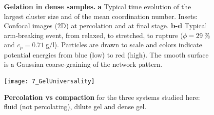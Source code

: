 \begin{figure}
	\centering
	\caption{\textbf{Gelation in dense samples.} \textbf{a} Typical time evolution of the largest cluster size and of the mean coordination number. Insets: Confocal images (2D) at percolation and at final stage. \textbf{b-d} Typical arm-breaking event, from relaxed, to stretched, to rupture ($\phi=29~\%$ and $c_p=\SI{0.71}{\gram\per\litre}$). Particles are drawn to scale and colors indicate potential energies from blue (low) to red (high). The smooth surface is a Gaussian coarse-graining of the network pattern. %
	}
	\label{fig:dense}
\end{figure}

\begin{figure}
	\centering
	\texttt{[image: 7\_GelUniversality]}
	\caption{\textbf{Percolation vs compaction} for the three systems studied here: fluid (not percolating), dilute gel and dense gel.}
	\label{fig:general}
\end{figure}

